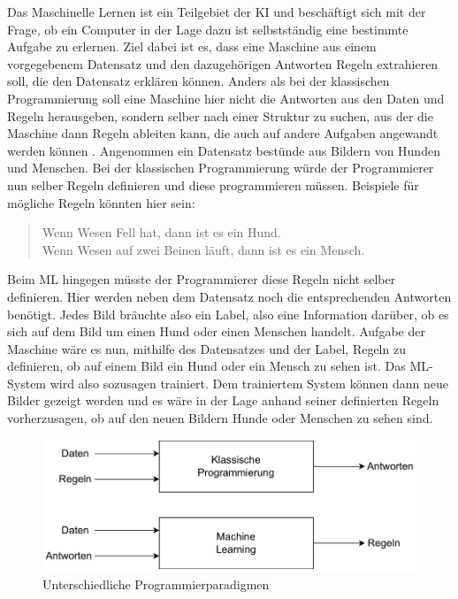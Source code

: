Das Maschinelle Lernen ist ein Teilgebiet der \ac{KI} und beschäftigt sich mit der Frage, ob ein Computer in der Lage dazu ist selbstständig eine bestimmte Aufgabe
zu erlernen. Ziel dabei ist es, dass eine Maschine aus einem vorgegebenem Datensatz und den dazugehörigen Antworten Regeln extrahieren soll, die den Datensatz erklären
können. Anders als bei der klassischen Programmierung soll eine Maschine hier nicht die Antworten aus den Daten und Regeln herausgeben, sondern selber nach einer
Struktur zu suchen, aus der die Maschine dann Regeln ableiten kann, die auch auf andere Aufgaben angewandt werden können \cite[vgl. S.23f.]{DL_PY}. Angenommen ein Datensatz bestünde aus
Bildern von Hunden und Menschen. Bei der klassischen Programmierung würde der Programmierer nun selber Regeln definieren und diese programmieren müssen. Beispiele für 
mögliche Regeln könnten hier sein:
\begin{quote}
    Wenn Wesen Fell hat, dann ist es ein Hund.\\
    Wenn Wesen auf zwei Beinen läuft, dann ist es ein Mensch.
\end{quote}
Beim \ac{ML} hingegen müsste der Programmierer diese Regeln nicht selber definieren. Hier werden neben dem Datensatz noch die entsprechenden Antworten benötigt. 
Jedes Bild bräuchte also ein Label, also eine Information darüber, ob es sich auf dem Bild um einen Hund oder einen Menschen handelt. Aufgabe der Maschine wäre es nun, 
mithilfe des Datensatzes und der Label, Regeln zu definieren, ob auf einem Bild ein Hund oder ein Mensch zu sehen ist. Das \ac{ML}-System wird also sozusagen trainiert. 
Dem trainiertem System können dann neue Bilder gezeigt werden und es wäre in der Lage anhand seiner definierten Regeln vorherzusagen, ob auf den neuen Bildern Hunde oder 
Menschen zu sehen sind. 

\begin{figure}[H]
    \centering
    \includegraphics[scale=0.7]{abbildungen/Programmierparadigmen.pdf}
    \caption{Unterschiedliche Programmierparadigmen \cite[S.23]{DL_PY}}
    \label{fig:Programmierparadigma}
\end{figure}

